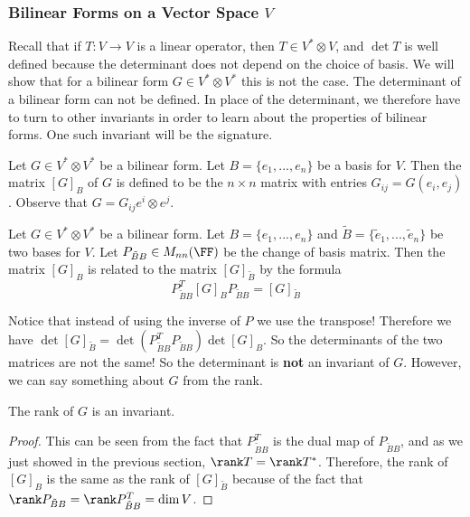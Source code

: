 \subsubsection{Bilinear Forms on a Vector Space $V$}
Recall that if $T : V \to V$ is a linear operator, then $T \in V^* \otimes V$, and $\det T$ is well defined because the determinant does not depend on the choice of basis. We will show that for a bilinear form $G \in V^* \otimes V^*$ this is not the case. The determinant of a bilinear form can not be defined. In place of the determinant, we therefore have to turn to other invariants in order to learn about the properties of bilinear forms. One such invariant will be the signature.
\begin{defn}
    Let $G \in V^* \otimes V^*$ be a bilinear form. Let $B=\{e_1,...,e_n\}$ be a basis for $V$. Then the matrix $[G]_B$ of $G$ is defined to be the $n\times n$ matrix with entries $G_{ij} = G(e_i,e_j)$. Observe that $G = G_{ij} e^i \otimes e^j$.
\end{defn}
\begin{thm}
    Let $G \in V^* \otimes V^*$ be a bilinear form. Let $B=\{e_1,...,e_n\}$ and $\tilde{B} = \{\tilde{e}_1,...,\tilde{e}_n\}$ be two bases for $V$. Let $P_{\tilde{B}B} \in M_{nn}(\FF)$ be the change of basis matrix. Then the matrix $[G]_B$ is related to the matrix $[G]_{\tilde{B}}$ by the formula
    \begin{equation}
        P_{\tilde{B}B}^T [G]_{B} P_{\tilde{B}B} = [G]_{\tilde{B}}
    \end{equation}
\end{thm}
Notice that instead of using the inverse of $P$ we use the transpose! Therefore we have $\det [G]_{\tilde{B}} = \det(P_{\tilde{B}B}^TP_{\tilde{B}B})\det [G]_{B}$. So the determinants of the two matrices are not the same! So the determinant is \textbf{not} an invariant of $G$. However, we can say something about $G$ from the rank. 
\begin{lemma} The rank of $G$ is an invariant.
\end{lemma}
\begin{proof}
This can be seen from the fact that $P_{\tilde{B} B}^T$ is the dual map of $P_{\tilde{B} B}$, and as we just showed in the previous section, $\rank T = \rank T^*$. Therefore, the rank of $[G]_B$ is the same as the rank of $[G]_{\tilde{B}}$ because of the fact that $\rank P_{\tilde{B}B} = \rank P_{\tilde{B} B}^T = \dim V$. 
\end{proof}
